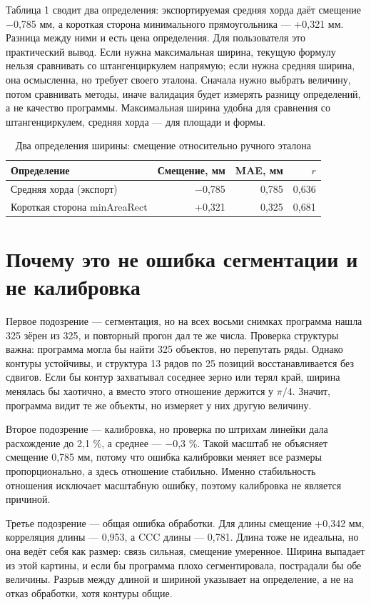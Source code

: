 \documentclass[12pt,a4paper]{article}
\begin{document}
\pagebreak[4]
Таблица 1 сводит два определения: экспортируемая средняя хорда даёт
смещение $-$0,785 мм, а короткая сторона минимального прямоугольника ---
+0,321 мм. Разница между ними и есть цена определения. Для пользователя это
практический вывод. Если нужна максимальная ширина, текущую формулу нельзя
сравнивать со штангенциркулем напрямую; если нужна средняя ширина, она
осмысленна, но требует своего эталона. Сначала нужно выбрать величину,
потом сравнивать методы, иначе валидация будет измерять разницу определений,
а не качество программы. Максимальная ширина удобна для сравнения со
штангенциркулем, средняя хорда --- для площади и формы.

\begin{table}[htbp]
\centering
\small
\caption{Два определения ширины: смещение относительно ручного эталона}
\label{tab:width-def}
\begin{tabular}{@{}lrrr@{}}
\toprule
Определение & Смещение, мм & MAE, мм & $r$ \\
\midrule
Средняя хорда (экспорт) & $-$0,785 & 0,785 & 0,636 \\
Короткая сторона minAreaRect & +0,321 & 0,325 & 0,681 \\
\bottomrule
\end{tabular}
\end{table}

\section{Почему это не ошибка сегментации и не калибровка}

Первое подозрение --- сегментация, но на всех восьми снимках программа
нашла 325 зёрен из 325, и повторный прогон дал те же числа. Проверка
структуры важна: программа могла бы найти 325 объектов, но перепутать ряды.
Однако контуры устойчивы, и структура 13 рядов по 25 позиций
восстанавливается без сдвигов. Если бы контур захватывал соседнее зерно или
терял край, ширина менялась бы хаотично, а вместо этого отношение держится
у $\pi/4$. Значит, программа видит те же объекты, но измеряет у них другую
величину.

Второе подозрение --- калибровка, но проверка по штрихам линейки дала
расхождение до 2,1 \%, а среднее --- $-$0,3 \%. Такой масштаб не объясняет
смещение 0,785 мм, потому что ошибка калибровки меняет все размеры
пропорционально, а здесь отношение стабильно. Именно стабильность отношения
исключает масштабную ошибку, поэтому калибровка не является причиной.

Третье подозрение --- общая ошибка обработки. Для длины смещение +0,342
мм, корреляция длины --- 0,953, а CCC длины --- 0,781. Длина тоже не
идеальна, но она ведёт себя как размер: связь сильная, смещение умеренное.
Ширина выпадает из этой картины, и если бы программа плохо сегментировала,
пострадали бы обе величины. Разрыв между длиной и шириной указывает на
определение, а не на отказ обработки, хотя контуры общие.
\end{document}
